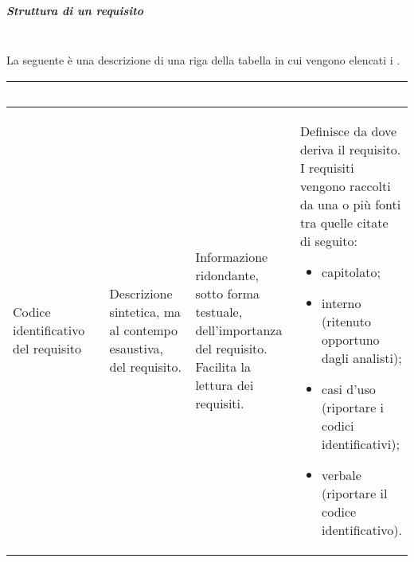 \subparagraph*{Struttura di un requisito}\mbox{}\\
La seguente è una descrizione di una riga della tabella in cui vengono elencati i .

{
\renewcommand{\arraystretch}{1.5}
\centering
\begin{longtable}{C{3cm} C{3.2cm} C{4.3cm} C{4.3cm}}
\textcolor{white}{\textbf{Identificativo}} & %
\textcolor{white}{\textbf{Descrizione}} & %
\textcolor{white}{\textbf{Classificazione}} & %
\textcolor{white}{\textbf{Fonti}} \\ %
\endhead
Codice identificativo del requisito & %
Descrizione sintetica, ma al contempo esaustiva, del requisito. & %
Informazione ridondante, sotto forma testuale, dell’importanza del requisito. Facilita la lettura dei requisiti. & %
Definisce da dove deriva il requisito. I requisiti vengono raccolti da una o più fonti tra quelle citate di seguito:
\begin{itemize}
	\item capitolato;
	\item interno (ritenuto opportuno dagli analisti);
	\item casi d'uso (riportare i codici identificativi);
	\item verbale (riportare il codice identificativo).
\end{itemize} \\
\end{longtable}
}
